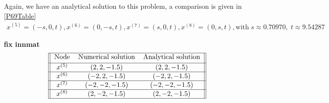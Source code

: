 Again, we have an analytical solution to this problem, a comparison is given in \eqref{P69Table} 
\begin{equation*}
    \begin{gathered}
    x^{(5)} = (-s,0,t),x^{(6)} = (0,-s,t),x^{(7)} = (s,0,t),x^{(8)} = (0,s,t),  \text{with}\; s \approx 0.70970, \; t \approx 9.54287
    \end{gathered}
\end{equation*}

\textbf{fix innmat}
\begin{gather}    
\label{P69Table}
\begin{tabular}{||c c c||} 
 \hline
 Node & Numerical solution & Analytical solution \\ [0.5ex] 
 \hline
$x^{(5)}$ & $(2,2,-1.5)$ & $(2,2,-1.5)$  \\ 
 \hline
 $x^{(6)}$ & $(-2,2,-1.5)$& $(-2,2,-1.5)$  \\ 
 \hline
 $x^{(7)}$ & $(-2,-2,-1.5)$ & $(-2,-2,-1.5)$\\ 
 \hline
 $x^{(8)}$ & $(2,-2,-1.5)$ & $(2,-2,-1.5)$ \\ 
 \hline
\end{tabular}
\end{gather}




